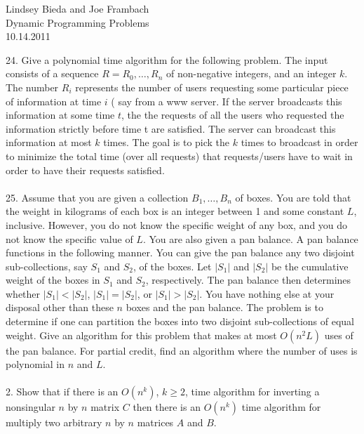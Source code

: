 \documentclass[10pt]{article}
\begin{document}
	\begin{flushright}
	Lindsey Bieda and Joe Frambach\\
	Dynamic Programming Problems\\
	10.14.2011
	\end{flushright}
	24.	Give a polynomial time algorithm for the following problem. The input consists of a sequence $R =
		R_0 , \ldots , R_n$ of non-negative integers, and an integer $k$. The number $R_i$ represents the number of
		users requesting some particular piece of information at time $i$ ( say from a www server. If the
		server broadcasts this information at some time $t$, the the requests of all the users who requested the
		information strictly before time t are satisfied. The server can broadcast this information at most
		$k$ times. The goal is to pick the $k$ times to broadcast in order to minimize the total time (over all
		requests) that requests/users have to wait in order to have their requests satisfied.\\
		\\
	25.	Assume that you are given a collection $B_1 , \ldots, B_n$ of boxes. You are told that the weight in kilograms
		of each box is an integer between 1 and some constant $L$, inclusive. However, you do not know the
		specific weight of any box, and you do not know the specific value of $L$. You are also given a pan
		balance. A pan balance functions in the following manner. You can give the pan balance any two
		disjoint sub-collections, say $S_1$ and $S_2$, of the boxes. Let $|S_1|$ and $|S_2|$ be the cumulative weight of the
		boxes in $S_1$ and $S_2$, respectively. The pan balance then determines whether $|S_1| < |S_2|$, $|S_1| = |S_2|$,
		or $|S_1| > |S_2|$. You have nothing else at your disposal other than these $n$ boxes and the pan balance.
		The problem is to determine if one can partition the boxes into two disjoint sub-collections of equal
		weight. Give an algorithm for this problem that makes at most $O(n^2 L)$ uses of the pan balance. For
		partial credit, find an algorithm where the number of uses is polynomial in $n$ and $L$.\\
		\\
	2.	Show that if there is an $O(n^k )$, $k \geq 2$, time algorithm for inverting a nonsingular $n$ by $n$ matrix $C$
		then there is an $O(n^k)$ time algorithm for multiply two arbitrary $n$ by $n$ matrices $A$ and $B$.	
			
\end{document}
